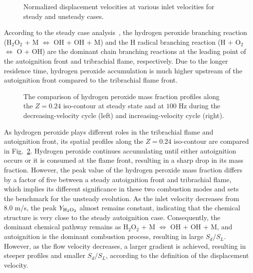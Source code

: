 \documentclass{essci}
\begin{document}
\begin{figure}[t]
  \centering
  \scriptsize
  \resizebox{0.5\textwidth}{!}{}
  \normalsize
  \vspace{-0.2in}
  \caption{Normalized displacement velocities at various inlet velocities for steady and unsteady cases.}
  \label{fig:sd_hys}
\end{figure}

 According to the steady case analysis~\cite{deng15b}, the hydrogen peroxide branching reaction (H$_2$O$_2$ + M $\Longleftrightarrow$ OH + OH + M) and the H radical branching reaction (H + O$_2$ $\Longleftrightarrow$ O + OH) are the dominant chain branching reactions at the leading point of the autoignition front and tribrachial flame, respectively.  Due to the longer residence time, hydrogen peroxide accumulation is much higher upstream of the autoignition front compared to the tribrachial flame front.

\begin{figure}[t]
  \centering
  \scriptsize
  \resizebox{0.49\textwidth}{!}{}
  \resizebox{0.49\textwidth}{!}{}
  \vspace{-0.2in}
  \normalsize
  \caption{The comparison of hydrogen peroxide mass fraction profiles along the $Z = 0.24$ iso-contour at steady state and at $100$ Hz during the decreasing-velocity cycle (left) and increasing-velocity cycle (right).}
  \label{fig:H2O2_updown}
\end{figure}

As hydrogen peroxide plays different roles in the tribrachial flame and autoignition front, its spatial profiles along the $Z = 0.24$ iso-contour are compared in Fig.~\ref{fig:H2O2_updown}.  Hydrogen peroxide continues accumulating until either autoignition occurs or it is consumed at the flame front, resulting in a sharp drop in its mass fraction.  However, the peak value of the hydrogen peroxide mass fraction differs by a factor of five between a steady autoignition front and tribrachial flame, which implies its different significance in these two combustion modes and sets the benchmark for the unsteady evolution.  As the inlet velocity decreases from $8.0$ m/s, the peak $Y_{\rm H{_2}O{_2}}$ almost remains constant, indicating that the chemical structure is very close to the steady autoignition case.  Consequently, the dominant chemical pathway remains as H$_2$O$_2$ + M $\Longleftrightarrow$ OH + OH + M, and autoignition is the dominant combustion process, resulting in large $S_d/S_L$.  However, as the flow velocity decreases, a larger gradient is achieved, resulting in steeper profiles and smaller $S_d/S_L$, according to the definition of the displacement velocity.
\end{document}
